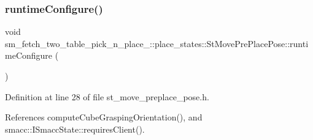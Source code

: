 \subsubsection{\texorpdfstring{runtime\+Configure()}{runtimeConfigure()}}
{\footnotesize\ttfamily void sm\+\_\+fetch\+\_\+two\+\_\+table\+\_\+pick\+\_\+n\+\_\+place\+\_\+::place\+\_\+states\+::\+St\+Move\+Pre\+Place\+Pose\+::runtime\+Configure (\begin{DoxyParamCaption}{ }\end{DoxyParamCaption})\hspace{0.3cm}{\ttfamily [inline]}}



Definition at line 28 of file st\+\_\+move\+\_\+preplace\+\_\+pose.\+h.



References compute\+Cube\+Grasping\+Orientation(), and smacc\+::\+I\+Smacc\+State\+::requires\+Client().


